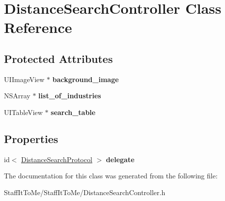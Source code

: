 \hypertarget{interface_distance_search_controller}{
\section{\-Distance\-Search\-Controller \-Class \-Reference}
\label{interface_distance_search_controller}
}
\subsection*{\-Protected \-Attributes}
\begin{DoxyCompactItemize}
\item 
\hypertarget{interface_distance_search_controller_adafe3ccffe3e76cd7d3df55e024a7643}{
\-U\-I\-Image\-View $\ast$ {\bfseries background\-\_\-image}}
\label{interface_distance_search_controller_adafe3ccffe3e76cd7d3df55e024a7643}

\item 
\hypertarget{interface_distance_search_controller_aabaaa2298f0c5007b96ef7da01920f09}{
\-N\-S\-Array $\ast$ {\bfseries list\-\_\-of\-\_\-industries}}
\label{interface_distance_search_controller_aabaaa2298f0c5007b96ef7da01920f09}

\item 
\hypertarget{interface_distance_search_controller_a2a3507fda46c863eb575aec473b307b2}{
\-U\-I\-Table\-View $\ast$ {\bfseries search\-\_\-table}}
\label{interface_distance_search_controller_a2a3507fda46c863eb575aec473b307b2}

\end{DoxyCompactItemize}
\subsection*{\-Properties}
\begin{DoxyCompactItemize}
\item 
\hypertarget{interface_distance_search_controller_a6ee4b131dadbdd989065e165eaf904a1}{
id$<$ \hyperlink{protocol_distance_search_protocol-p}{\-Distance\-Search\-Protocol} $>$ {\bfseries delegate}}
\label{interface_distance_search_controller_a6ee4b131dadbdd989065e165eaf904a1}

\end{DoxyCompactItemize}


\-The documentation for this class was generated from the following file\-:\begin{DoxyCompactItemize}
\item 
\-Staff\-It\-To\-Me/\-Staff\-It\-To\-Me/\-Distance\-Search\-Controller.\-h\end{DoxyCompactItemize}

